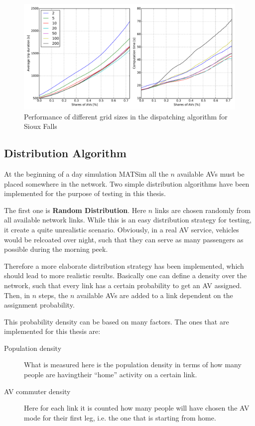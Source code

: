 \begin{figure}
    \centering
    \includegraphics[width=1.0\textwidth]{figures/gridsize.pdf}
    \caption{Performance of different grid sizes in the dispatching algorithm for Sioux Falls}
    \label{fig:gridsize}
\end{figure}

\subsection{Distribution Algorithm}

At the beginning of a day simulation MATSim all the $n$ available AVs must be placed
somewhere in the network. Two simple distribution algorithms have been implemented
for the purpose of testing in this thesis.

The first one is \textbf{Random Distribution}. Here $n$ links are chosen randomly
from all available network links. While this is an easy distribution strategy for testing,
it create a quite unrealistic scenario. Obviously, in a real AV service, vehicles
would be relcoated over night, such that they can serve as many passengers as
possible during the morning peek.

Therefore a more elaborate distribution strategy has been implemented, which should
lead to more realistic results. Basically one can define a density over the network,
such that every link has a certain probability to get an AV assigned. Then, in $n$
steps, the $n$ available AVs are added to a link dependent on the assignment
probability.

This probability density can be based on many factors. The ones that are implemented
for this thesis are:

\begin{description}
\item[Population density] What is measured here is the population density in terms of
how many people are havingtheir ``home'' activity on a certain link.
\item[AV commuter density] Here for each link it is counted how many people will
have chosen the AV mode for their first leg, i.e. the one that is starting from home.
\end{description}

